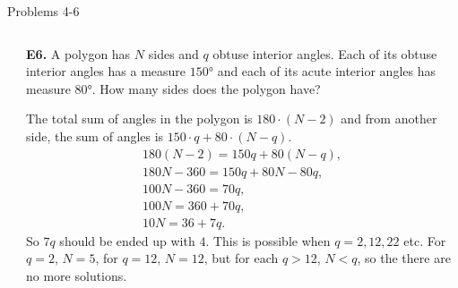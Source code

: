 \documentclass[9pt,aspectratio=169]{beamer}
\begin{document}
\begin{frame}{Problems 4-6}
\begin{columns}[T]
\begin{column}{0.5\textwidth}
    \end{column}
    \begin{column}{0.5\textwidth}
      \begin{problem}
        \textbf{E6.} A polygon has $N$ sides and $q$ obtuse interior angles. Each of its obtuse interior angles has a measure $150°$ and each of its acute interior angles has measure $80°$. How many sides does the polygon have?
      \end{problem}\pause
      The total sum of angles in the polygon is $180 \cdot (N - 2)$ and from another side, the sum of angles is $150 \cdot q + 80 \cdot (N - q)$.
      \begin{gather*}
        180 (N - 2) = 150 q + 80 (N - q),\\
        180 N - 360 = 150 q + 80 N - 80 q,\\
        100 N - 360 = 70 q, \\
        100 N = 360 + 70 q, \\
        10 N = 36 + 7q.
      \end{gather*}\pause
      So $7q$ should be ended up with $4$. This is possible when $q = 2, 12, 22$ etc. For $q = 2$, $\boxed{N = 5}$, for $q = 12$, $\boxed{N = 12}$, but for each $q> 12$, $N < q$, so the there are no more solutions. 
    \end{column}
  \end{columns}
\end{frame}
\end{document}
